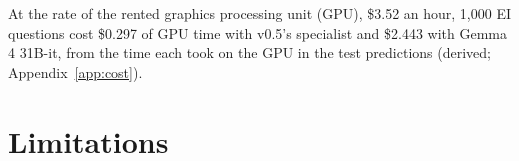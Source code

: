 \documentclass[11pt,letterpaper]{article}
\begin{document}
\begin{table}[t]
\centering\scriptsize
\caption{K7 (registered; secondary and descriptive): the combined accuracy of v0.5's Evidence Inference 2.0 specialist and Gemma 4 31B-it, reading the same input, when a share of the 1,218 test prompts is handed to the large model, with 95 percent intervals from 1,000 article resamples. The learned rule was fitted and frozen on validation. Random gives the expected value of random hand-off. The large model's confidence hands off first the items on which the large model's own top probability is highest, which needs its answer on every item. The oracle hands off the items the specialist gets wrong and the large model gets right, which bounds any rule. v0.5 alone: 0.9269; the large model alone: 0.8752.}
\label{tab:handoff}

\end{table}

At the rate of the rented graphics processing unit (GPU), \$3.52 an hour, 1,000 EI questions cost \$0.297 of GPU time with v0.5's specialist and \$2.443 with Gemma 4 31B-it, from the time each took on the GPU in the test predictions (derived; Appendix~\ref{app:cost}).

\section{Limitations}
\label{sec:limits}
\end{document}
